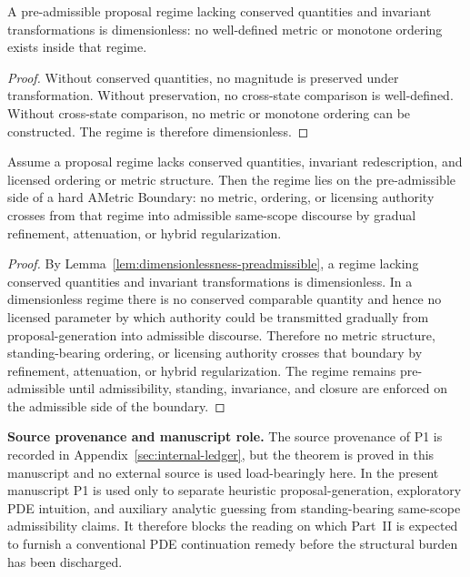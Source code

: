 \begin{lemma}\label{lem:dimensionlessness-preadmissible}
A pre-admissible proposal regime lacking conserved quantities and invariant transformations is dimensionless: no well-defined metric or monotone ordering exists inside that regime.
\end{lemma}

\begin{proof}
Without conserved quantities, no magnitude is preserved under transformation. Without preservation, no cross-state comparison is well-defined. Without cross-state comparison, no metric or monotone ordering can be constructed. The regime is therefore dimensionless.
\end{proof}

\begin{manualtheorem}
\label{thm:imported-ametric-boundary}
Assume a proposal regime lacks conserved quantities, invariant redescription, and licensed ordering or metric structure. Then the regime lies on the pre-admissible side of a hard AMetric Boundary: no metric, ordering, or licensing authority crosses from that regime into admissible same-scope discourse by gradual refinement, attenuation, or hybrid regularization.
\end{manualtheorem}

\begin{proof}
By Lemma~\ref{lem:dimensionlessness-preadmissible}, a regime lacking conserved quantities and invariant transformations is dimensionless. In a dimensionless regime there is no conserved comparable quantity and hence no licensed parameter by which authority could be transmitted gradually from proposal-generation into admissible discourse. Therefore no metric structure, standing-bearing ordering, or licensing authority crosses that boundary by refinement, attenuation, or hybrid regularization. The regime remains pre-admissible until admissibility, standing, invariance, and closure are enforced on the admissible side of the boundary.
\end{proof}

\noindent\textbf{Source provenance and manuscript role.} The source provenance of P1 is recorded in Appendix~\ref{sec:internal-ledger}, but the theorem is proved in this manuscript and no external source is used load-bearingly here. In the present manuscript P1 is used only to separate heuristic proposal-generation, exploratory PDE intuition, and auxiliary analytic guessing from standing-bearing same-scope admissibility claims. It therefore blocks the reading on which Part~II is expected to furnish a conventional PDE continuation remedy before the structural burden has been discharged.

